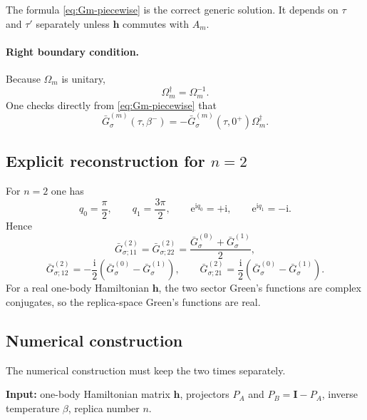 \documentclass[11pt]{article}
\newcommand{\e}{\mathrm{e}}
\newcommand{\ii}{\mathrm{i}}
\newcommand{\1}{\mathds{1}}
\newcommand{\bh}{\bm{h}}
\newcommand{\bI}{\bm{I}}
\newcommand{\br}[1]{\left(#1\right)}
\begin{document}
The formula \eqref{eq:Gm-piecewise} is the correct generic solution. It
depends on $\tau$ and $\tau'$ separately unless $\bh$ commutes with $A_m$.

\paragraph{Right boundary condition.}
Because $\Omega_m$ is unitary,
\begin{equation}
\Omega_m^\dagger=\Omega_m^{-1}.
\label{eq:Omega-unitary}
\end{equation}
One checks directly from \eqref{eq:Gm-piecewise} that
\begin{equation}
\bar G_\sigma^{(m)}(\tau,\beta^-)
=
-\bar G_\sigma^{(m)}(\tau,0^+)\Omega_m^\dagger.
\label{eq:right-boundary}
\end{equation}

\subsection{Explicit reconstruction for $n=2$}

For $n=2$ one has
\begin{equation}
q_0=\frac{\pi}{2},
\qquad
q_1=\frac{3\pi}{2},
\qquad
\e^{\ii q_0}=+\ii,
\qquad
\e^{\ii q_1}=-\ii.
\label{eq:n2-phases}
\end{equation}
Hence
\begin{equation}
\bar G_{\sigma;11}^{(2)}=\bar G_{\sigma;22}^{(2)}
=
\frac{\bar G_\sigma^{(0)}+\bar G_\sigma^{(1)}}{2},
\label{eq:n2-diag}
\end{equation}
\begin{equation}
\bar G_{\sigma;12}^{(2)}
=
-\frac{\ii}{2}\br{\bar G_\sigma^{(0)}-\bar G_\sigma^{(1)}},
\qquad
\bar G_{\sigma;21}^{(2)}
=
\frac{\ii}{2}\br{\bar G_\sigma^{(0)}-\bar G_\sigma^{(1)}}.
\label{eq:n2-offdiag}
\end{equation}
For a real one-body Hamiltonian $\bh$, the two sector Green's functions are
complex conjugates, so the replica-space Green's functions are real.

\subsection{Numerical construction}

The numerical construction must keep the two times separately.

\medskip
\textbf{Input:} one-body Hamiltonian matrix $\bh$, projectors $P_A$ and
$P_B=\bI-P_A$, inverse temperature $\beta$, replica number $n$.
\end{document}
